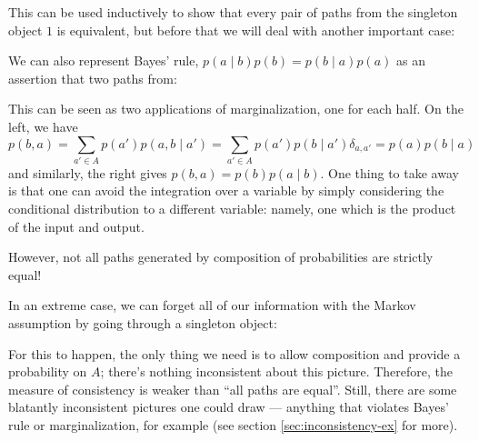 \documentclass{article}
\begin{document}
	This can be used inductively to show that every pair of paths from the singleton object $1$ is equivalent, but before that we will deal with another important case:
	
	\begin{example} \label{ex:bayesrule}
		We can also represent Bayes' rule, $p(a \mid b) p(b) = p(b \mid a) p(a)$ as an assertion that two paths from:
		\begin{center}
		\end{center}
		This can be seen as two applications of marginalization, one for each half. On the left, we have
		\[ p(b, a) = \sum_{a' \in A} p(a')p(a,b \mid a') = \sum_{a' \in A} p(a') p(b \mid a') \delta_{a,a'} = p(a) p(b \mid a) \]
		and similarly, the right gives $p(b,a) = p(b) p(a \mid b)$. One thing to take away is that one can avoid the integration over a variable by simply considering the conditional distribution to a different variable: namely, one which is the product of the input and output. 
	\end{example}
	
	
	However, not all paths generated by composition of probabilities are strictly equal! 
	
	\begin{example}
		In an extreme case, we can forget all of our information with the Markov assumption by going through a singleton object:
		
		\begin{center}
		\end{center}
	\end{example}
	
	For this to happen, the only thing we need is to allow composition and provide a probability on $A$; there's nothing inconsistent about this picture. Therefore, the measure of consistency is weaker than ``all paths are equal''. Still, there are some blatantly inconsistent pictures one could draw --- anything that violates Bayes' rule or marginalization, for example (see section \ref{sec:inconsistency-ex} for more).
	
\end{document}
